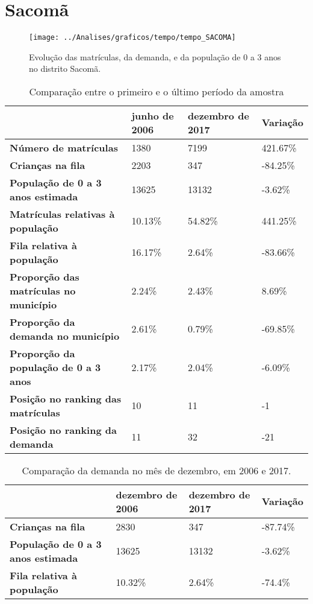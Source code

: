 \section{Sacomã}
\begin{figure}[H]
\centering
\texttt{[image: ../Analises/graficos/tempo/tempo\_SACOMA]}
\caption{Evolução das matrículas, da demanda, e da população de 0 a 3 anos no distrito Sacomã.}
\end{figure}
\begin{table}[H]
\begin{tabular}{|l|l|l|l|}
\hline
\textbf{}                                      & \textbf{junho de 2006}       & \textbf{dezembro de 2017}    & \textbf{Variação} \\ \hline
\textbf{Número de matrículas}                  & 1380 & 7199 & 421.67\% \\ \hline
\textbf{Crianças na fila}                      & 2203 & 347 & -84.25\% \\ \hline
\textbf{População de 0 a 3 anos estimada}      & 13625 & 13132 & -3.62\% \\ \hline
\textbf{Matrículas relativas à população}      & 10.13\% & 54.82\% & 441.25\% \\ \hline
\textbf{Fila relativa à população}             & 16.17\% & 2.64\% & -83.66\% \\ \hline
\textbf{Proporção das matrículas no município} & 2.24\% & 2.43\% & 8.69\% \\ \hline
\textbf{Proporção da demanda no município}     & 2.61\% & 0.79\% & -69.85\% \\ \hline
\textbf{Proporção da população de 0 a 3 anos}  & 2.17\% & 2.04\% & -6.09\% \\ \hline
\textbf{Posição no ranking das matrículas}     & 10 & 11 & -1 \\ \hline
\textbf{Posição no ranking da demanda}         & 11 & 32 & -21 \\ \hline
\end{tabular}
\caption{Comparação entre o primeiro e o último período da amostra}
\end{table}
\begin{table}[H]
\begin{tabular}{|l|l|l|l|}
\hline
\textbf{}                                 & \textbf{dezembro de 2006} & \textbf{dezembro de 2017} & \textbf{Variação} \\ \hline
\textbf{Crianças na fila}                      & 2830 & 347 & -87.74\% \\ \hline
\textbf{População de 0 a 3 anos estimada}      & 13625 & 13132 & -3.62\% \\ \hline
\textbf{Fila relativa à população}             & 10.32\% & 2.64\% & -74.4\% \\ \hline
\end{tabular}
\caption{Comparação da demanda no mês de dezembro, em 2006 e 2017.}
\end{table}
